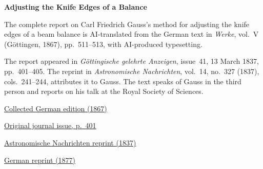 \clearpage
\thispagestyle{empty}
\begin{center}\Large\textbf{Adjusting the Knife Edges of a Balance}\end{center}

The complete report on Carl Friedrich Gauss’s method for adjusting the knife edges of a beam balance is AI-translated from the German text in \textit{Werke}, vol.~V (Göttingen, 1867), pp.~511--513, with AI-produced typesetting.

The report appeared in \textit{Göttingische gelehrte Anzeigen}, issue~41, 13 March 1837, pp.~401--405. The reprint in \textit{Astronomische Nachrichten}, vol.~14, no.~327 (1837), cols.~241--244, attributes it to Gauss. The text speaks of Gauss in the third person and reports on his talk at the Royal Society of Sciences.

\medskip\noindent
\href{https://gdz.sub.uni-goettingen.de/id/PPN236006339}{Collected German edition (1867)}\par
\noindent\href{https://api.digitale-sammlungen.de/iiif/image/v2/bsb10538714_00407/full/1150,/0/default.jpg}{Original journal issue, p.~401}\par
\noindent\href{https://mctoon.net/wp-content/uploads/2019/12/astronomische-nachrichten-313-336.pdf\#page=141}{Astronomische Nachrichten reprint (1837)}\par
\noindent\href{https://doi.org/10.1007/978-3-642-49319-5_26}{German reprint (1877)}
\clearpage
